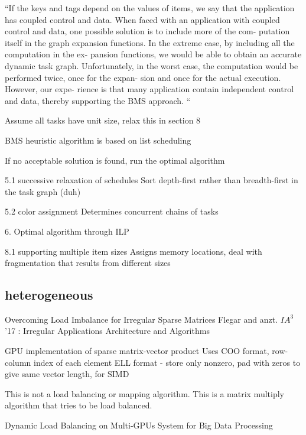 \documentclass{article}
\begin{document}
“If the keys and tags depend on the values of items, we say that the application has coupled control and data. 
When faced with an application with coupled control and data, one possible solution is to include more of the com- putation itself in the graph expansion functions. In the extreme case, by including all the computation in the ex- pansion functions, we would be able to obtain an accurate dynamic task graph. Unfortunately, in the worst case, the computation would be performed twice, once for the expan- sion and once for the actual execution. However, our expe- rience is that many application contain independent control and data, thereby supporting the BMS approach. “

Assume all tasks have unit size, relax this in section 8

BMS heuristic algorithm is based on list scheduling

If no acceptable solution is found, run the optimal algorithm

5.1 successive relaxation of schedules
Sort depth-first rather than breadth-first in the task graph (duh)

5.2 color assignment
Determines concurrent chains of tasks

6. Optimal algorithm through ILP

8.1 supporting multiple item sizes
Assigns memory locations, deal with fragmentation that results from different sizes




\subsection{heterogeneous}

\cite{Flegar:2017:OLI:3149704.3149767}



Overcoming Load Imbalance for Irregular Sparse Matrices 
Flegar and anzt. $IA^3$ ’17 : Irregular Applications Architecture and Algorithms

GPU implementation of sparse matrix-vector product
Uses COO format, row-column index of each element
ELL format - store only nonzero, pad with zeros to give same vector length, for SIMD

This is not a load balancing or mapping algorithm.  This is a matrix multiply algorithm that tries to be load balanced.


\bigskip

\cite{8082085}

\bigskip
Dynamic Load Balancing on Multi-GPUs System for Big Data Processing 
\end{document}
